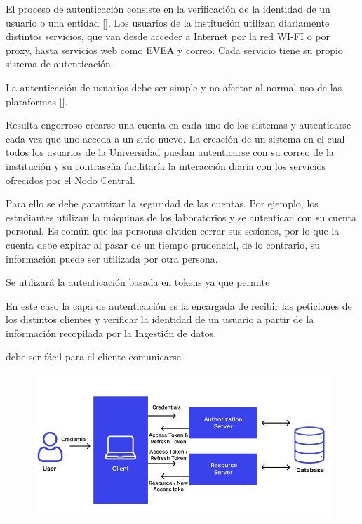 El proceso de autenticación consiste en la verificación de la identidad de un usuario o una entidad  [\cite{teheran2014mecanismo}]. Los usuarios de la institución utilizan diariamente distintos servicios, que van desde acceder a Internet por la red WI-FI o por proxy, hasta servicios web como EVEA y correo. Cada servicio tiene su propio sistema de autenticación.

La autenticación de usuarios debe ser simple y no afectar al normal uso de las plataformas  [\cite{morales2016autenticacion}].

Resulta engorroso crearse una cuenta en cada uno de los sistemas y autenticarse cada vez que uno acceda a un sitio nuevo. La creación de un sistema en el cual todos los usuarios de la Universidad puedan autenticarse con su correo de la institución y su contraseña facilitaría la interacción diaria con los servicios ofrecidos por el Nodo Central.

Para ello se debe garantizar la seguridad de las cuentas. Por ejemplo, los estudiantes utilizan la máquinas de los laboratorios y se autentican con su cuenta personal. Es común que las personas olviden cerrar sus sesiones, por lo que la cuenta debe expirar al pasar de un tiempo prudencial, de lo contrario, su información puede ser utilizada por otra persona.

Se utilizará la autenticación basada en tokens ya que permite 

En este caso la capa de autenticación es la encargada de recibir las peticiones de los distintos clientes y verificar la identidad de un usuario a partir de la información recopilada por la Ingestión de datos.

debe ser fácil para el cliente comunicarse

\begin{figure}[H]
	\centering
	\includegraphics[width=0.9\linewidth]{Graphics/token-based-auth}
	\caption{}
	\label{fig:token-based-auth}
\end{figure}



